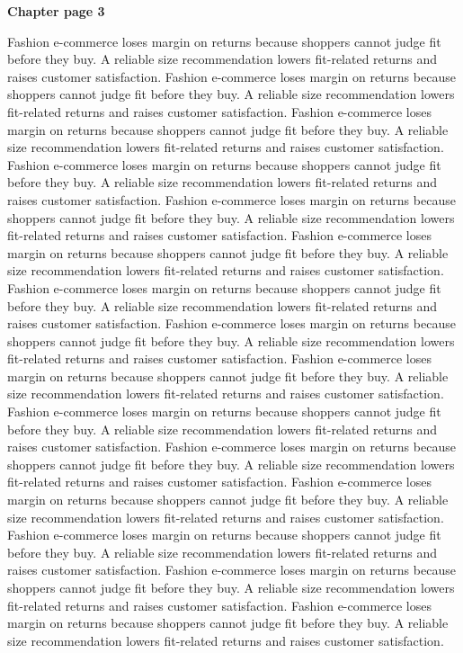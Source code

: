 \documentclass[a4paper,11pt]{article}
\begin{document}
{\headfont\bfseries\Large Chapter page 3}\par\medskip
Fashion e-commerce loses margin on returns because shoppers cannot judge fit before they buy. A reliable size recommendation lowers fit-related returns and raises customer satisfaction. Fashion e-commerce loses margin on returns because shoppers cannot judge fit before they buy. A reliable size recommendation lowers fit-related returns and raises customer satisfaction. Fashion e-commerce loses margin on returns because shoppers cannot judge fit before they buy. A reliable size recommendation lowers fit-related returns and raises customer satisfaction. Fashion e-commerce loses margin on returns because shoppers cannot judge fit before they buy. A reliable size recommendation lowers fit-related returns and raises customer satisfaction. Fashion e-commerce loses margin on returns because shoppers cannot judge fit before they buy. A reliable size recommendation lowers fit-related returns and raises customer satisfaction. 
Fashion e-commerce loses margin on returns because shoppers cannot judge fit before they buy. A reliable size recommendation lowers fit-related returns and raises customer satisfaction. Fashion e-commerce loses margin on returns because shoppers cannot judge fit before they buy. A reliable size recommendation lowers fit-related returns and raises customer satisfaction. Fashion e-commerce loses margin on returns because shoppers cannot judge fit before they buy. A reliable size recommendation lowers fit-related returns and raises customer satisfaction. Fashion e-commerce loses margin on returns because shoppers cannot judge fit before they buy. A reliable size recommendation lowers fit-related returns and raises customer satisfaction. Fashion e-commerce loses margin on returns because shoppers cannot judge fit before they buy. A reliable size recommendation lowers fit-related returns and raises customer satisfaction. 
Fashion e-commerce loses margin on returns because shoppers cannot judge fit before they buy. A reliable size recommendation lowers fit-related returns and raises customer satisfaction. Fashion e-commerce loses margin on returns because shoppers cannot judge fit before they buy. A reliable size recommendation lowers fit-related returns and raises customer satisfaction. Fashion e-commerce loses margin on returns because shoppers cannot judge fit before they buy. A reliable size recommendation lowers fit-related returns and raises customer satisfaction. Fashion e-commerce loses margin on returns because shoppers cannot judge fit before they buy. A reliable size recommendation lowers fit-related returns and raises customer satisfaction. Fashion e-commerce loses margin on returns because shoppers cannot judge fit before they buy. A reliable size recommendation lowers fit-related returns and raises customer satisfaction. \newpage
\end{document}
